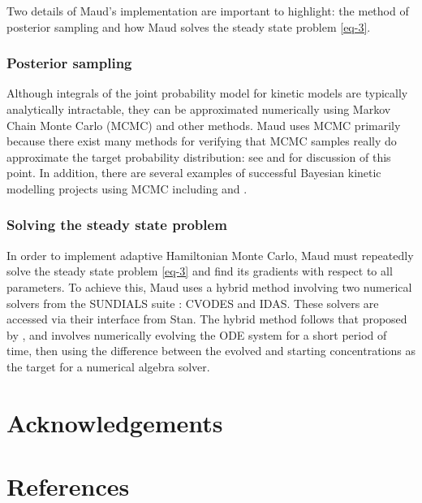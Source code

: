 \documentclass[journal=asbcd6,manuscript=article,layout=traditional]{achemso}
\begin{document}
Two details of Maud's implementation are important to highlight: the
method of posterior sampling and how Maud solves the steady state
problem \eqref{eq-3}.

\hypertarget{posterior-sampling}{%
\subsubsection{Posterior sampling}\label{posterior-sampling}}

Although integrals of the joint probability model for kinetic models are
typically analytically intractable, they can be approximated numerically
using Markov Chain Monte Carlo (MCMC) and other methods. Maud uses MCMC
primarily because there exist many methods for verifying that MCMC
samples really do approximate the target probability distribution: see
\citet{vehtariRankNormalizationFoldingLocalization2021} and
\citet{taltsValidatingBayesianInference2018} for discussion of this
point. In addition, there are several examples of successful Bayesian
kinetic modelling projects using MCMC including
\citet{st.johnBayesianInferenceMetabolic2018} and
\citet{xingModelingKineticsLargescale2010}.

\hypertarget{solving-the-steady-state-problem}{%
\subsubsection{Solving the steady state
problem}\label{solving-the-steady-state-problem}}

In order to implement adaptive Hamiltonian Monte Carlo, Maud must
repeatedly solve the steady state problem \eqref{eq-3} and find its
gradients with respect to all parameters. To achieve this, Maud uses a
hybrid method involving two numerical solvers from the SUNDIALS suite
\citep{serbanCVODESSensitivityEnabledODE2005}: CVODES and IDAS. These
solvers are accessed via their interface from Stan. The hybrid method
follows that proposed by \citet{margossianComputingSteadyStates2018},
and involves numerically evolving the ODE system for a short period of
time, then using the difference between the evolved and starting
concentrations as the target for a numerical algebra solver.

\hypertarget{acknowledgements}{%
\section{Acknowledgements}\label{acknowledgements}}

\hypertarget{references}{%
\section{References}\label{references}}

\renewcommand{\bibsection}{}

\end{document}
